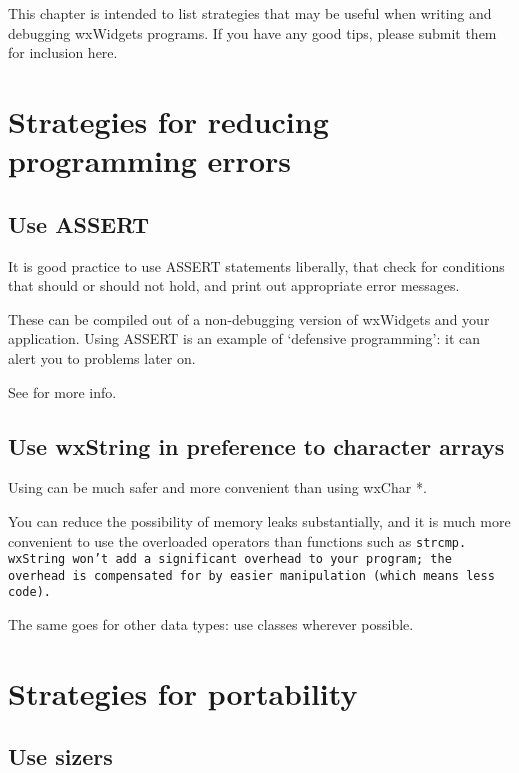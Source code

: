 This chapter is intended to list strategies that may be useful when
writing and debugging wxWidgets programs. If you have any good tips,
please submit them for inclusion here.

\section{Strategies for reducing programming errors}\label{reducingerrors}

\subsection{Use ASSERT}\label{useassert}

It is good practice to use ASSERT statements liberally, that check for conditions 
that should or should not hold, and print out appropriate error messages.

These can be compiled out of a non-debugging version of wxWidgets
and your application. Using ASSERT is an example of `defensive programming':
it can alert you to problems later on.

See  for more info.

\subsection{Use wxString in preference to character arrays}\label{usewxstring}

Using  can be much safer and more convenient than using wxChar *.

You can reduce the possibility of memory leaks substantially, and it is much more
convenient to use the overloaded operators than functions such as \tt{strcmp}.
wxString won't add a significant overhead to your program; the overhead is compensated 
for by easier manipulation (which means less code).

The same goes for other data types: use classes wherever possible.

\section{Strategies for portability}\label{portability}

\subsection{Use sizers}\label{usesizers}

